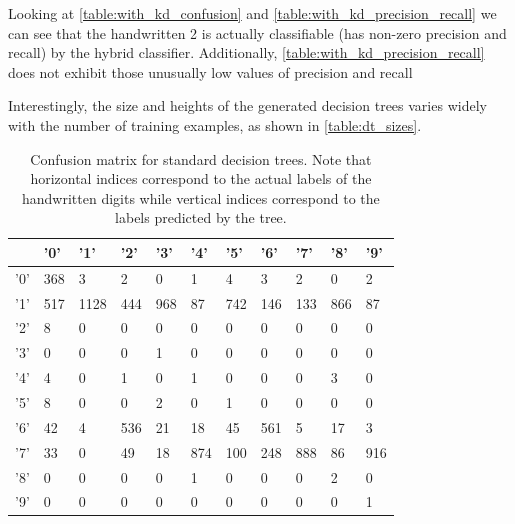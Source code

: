 Looking at \ref{table:with_kd_confusion} and \ref{table:with_kd_precision_recall} we can see that the handwritten 2 is actually classifiable (has non-zero precision and recall) by the hybrid classifier.  Additionally, \ref{table:with_kd_precision_recall} does not exhibit those unusually low values of precision and recall

Interestingly, the size and heights of the generated decision trees varies widely with the number of training examples, as shown in \ref{table:dt_sizes}.

\begin{table}
	\begin{tabular}{l|llllllllll}
		&   '0' &   '1' &   '2' &   '3' &   '4' &   '5' &   '6' &   '7' &   '8' &   '9' \\
		\hline
		'0' &   368 &     3 &     2 &     0 &     1 &     4 &     3 &     2 &     0 &     2 \\
		'1' &   517 &  1128 &   444 &   968 &    87 &   742 &   146 &   133 &   866 &    87 \\
		'2' &     8 &     0 &     0 &     0 &     0 &     0 &     0 &     0 &     0 &     0 \\
		'3' &     0 &     0 &     0 &     1 &     0 &     0 &     0 &     0 &     0 &     0 \\
		'4' &     4 &     0 &     1 &     0 &     1 &     0 &     0 &     0 &     3 &     0 \\
		'5' &     8 &     0 &     0 &     2 &     0 &     1 &     0 &     0 &     0 &     0 \\
		'6' &    42 &     4 &   536 &    21 &    18 &    45 &   561 &     5 &    17 &     3 \\
		'7' &    33 &     0 &    49 &    18 &   874 &   100 &   248 &   888 &    86 &   916 \\
		'8' &     0 &     0 &     0 &     0 &     1 &     0 &     0 &     0 &     2 &     0 \\
		'9' &     0 &     0 &     0 &     0 &     0 &     0 &     0 &     0 &     0 &     1 \\
	\end{tabular}
	\caption{Confusion matrix for standard decision trees.  Note that horizontal indices correspond to the actual labels of the handwritten digits while vertical indices correspond to the labels predicted by the tree.}
	\label{table:no_kd_confusion}
\end{table}


